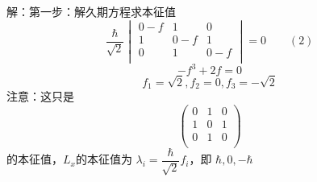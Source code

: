 \begin{frame} 
    \alert{解：}第一步：解久期方程求本征值
    $$\frac{\hbar}{\sqrt{2}}
    \begin{vmatrix}
       0-f & 1 & 0  \\
       1 & 0-f & 1  \\
       0 & 1 & 0-f \\
    \end{vmatrix} 
    =0 \qquad (2) $$
   $$ -f^3+2f=0 $$
   $$ f_1=\sqrt{2}, f_2=0, f_3=-\sqrt{2} $$
   注意：这只是
   $$\begin{pmatrix}
       0 & 1 & 0  \\
       1 & 0 & 1  \\
       0 & 1 & 0 \\
    \end{pmatrix} $$
    的本征值，$L_x$的本征值为 $\lambda_i=\dfrac{\hbar}{\sqrt{2}} f_i$，即 $ \hbar, 0, -\hbar$
\end{frame}

